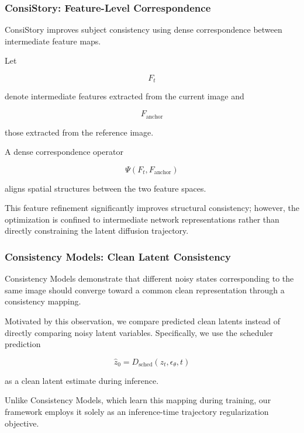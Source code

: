 \documentclass[12pt]{article}
\begin{document}
\subsubsection{ConsiStory: Feature-Level Correspondence}

ConsiStory improves subject consistency using dense correspondence between intermediate feature maps.

Let

\begin{equation}
F_t
\end{equation}

denote intermediate features extracted from the current image and

\begin{equation}
F_{\mathrm{anchor}}
\end{equation}

those extracted from the reference image.

A dense correspondence operator

\begin{equation}
\Psi(F_t, F_{\mathrm{anchor}})
\end{equation}

aligns spatial structures between the two feature spaces.

This feature refinement significantly improves structural consistency; however, the optimization is confined to intermediate network representations rather than directly constraining the latent diffusion trajectory.

\subsubsection{Consistency Models: Clean Latent Consistency}

Consistency Models demonstrate that different noisy states corresponding to the same image should converge toward a common clean representation through a consistency mapping.

Motivated by this observation, we compare predicted clean latents instead of directly comparing noisy latent variables. Specifically, we use the scheduler prediction

\begin{equation}
\hat{z}_0 = D_{\mathrm{sched}}(z_t, \epsilon_\theta, t)
\end{equation}

as a clean latent estimate during inference.

Unlike Consistency Models, which learn this mapping during training, our framework employs it solely as an inference-time trajectory regularization objective.
\end{document}

